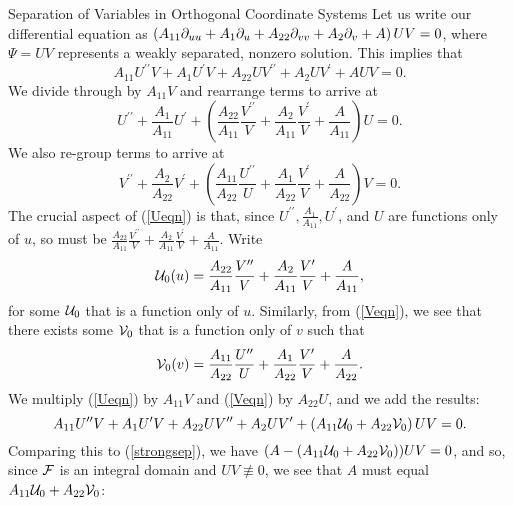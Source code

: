 \begin{section}{Separation of Variables in Orthogonal Coordinate Systems}
\proof
Let us write our differential equation as $\left( A_{11} \partial_{u u} + A_1 \partial_{u} + A_{22} \partial_{v v} + A_2 \partial_{v} + A \right) UV = 0$, where $\Psi = UV$ represents a weakly separated, nonzero solution.  This implies that
\begin{equation}
\label{strongsep}
A_{11} U^{\prime\prime}V + A_1 U^\prime V + A_{22} UV^{\prime\prime} + A_2 UV^\prime + A UV = 0.
\end{equation}
We divide through by $A_{11} V$ and rearrange terms to arrive at
\begin{equation}
\label{Ueqn}
U^{\prime\prime} + \frac{A_1}{A_{11}}U^\prime + \left( \frac{A_{22}}{A_{11}} \frac{V^{\prime\prime}}{V} + \frac{A_{2}}{A_{11}} \frac{V^\prime}{V} + \frac{A}{A_{11}} \right)U = 0.
\end{equation}
We also re-group terms to arrive at
\begin{equation}
\label{Veqn}
V^{\prime\prime} + \frac{A_2}{A_{22}}V^\prime + \left( \frac{A_{11}}{A_{22}} \frac{U^{\prime\prime}}{U} + \frac{A_{1}}{A_{22}} \frac{V^\prime}{V} + \frac{A}{A_{22}} \right)V = 0.
\end{equation}
The crucial aspect of (\ref{Ueqn}) is that, since $U^{\prime\prime}, \frac{A_1}{A_{11}}, U^\prime$, and $U$ are functions only of $u$, so must be $\frac{A_{22}}{A_{11}} \frac{V^{\prime\prime}}{V} + \frac{A_{2}}{A_{11}} \frac{V^\prime}{V} + \frac{A}{A_{11}}$.  Write
\begin{equation}
\label{cU0}
\mathcal{U}_0(u) = \frac{A_{22}}{A_{11}} \frac{V^{\prime\prime}}{V} + \frac{A_{2}}{A_{11}} \frac{V^\prime}{V} + \frac{A}{A_{11}},
\end{equation}
for some $\mathcal{U}_0$ that is a function only of $u$.  Similarly, from (\ref{Veqn}), we see that there exists some $\mathcal{V}_0$ that is a function only of $v$ such that
\begin{equation}
\label{cV0}
\mathcal{V}_0(v) = \frac{A_{11}}{A_{22}} \frac{U^{\prime\prime}}{U} + \frac{A_{1}}{A_{22}} \frac{V^\prime}{V} + \frac{A}{A_{22}}.
\end{equation}
We multiply (\ref{Ueqn}) by $A_{11} V$ and (\ref{Veqn}) by $A_{22} U$, and we add the results:
\begin{equation}
\label{Ueqn+Veqn}
A_{11} U^{\prime\prime} V + A_1 U^\prime V + A_{22} U V^{\prime\prime} + A_2 U V^{\prime} + \left( A_{11} \mathcal{U}_0 + A_{22} \mathcal{V}_0 \right) U V = 0.
\end{equation}
Comparing this to (\ref{strongsep}), we have $(A - (A_{11}\mathcal{U}_0 + A_{22}\mathcal{V}_0))UV = 0$, and so, since $\mathcal{F}$ is an integral domain and $UV \not\equiv 0$, we see that $A$ must equal $A_{11} \mathcal{U}_0 + A_{22} \mathcal{V}_0$:

\end{section}
